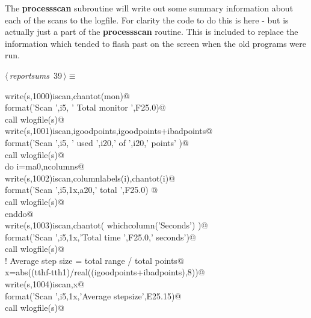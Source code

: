 \documentclass[10pt,a4paper,notitlepage]{article}
\newcommand{\code}[1]{\textbf{\textsf{#1}}} %
\begin{document}
The \code{processscan} subroutine will write out some summary information 
about each of the scans to the logfile. 
For clarity the code to do this is here - but is actually just a part of
the \code{processscan} routine. 
This is included to replace the information which tended to flash past 
on the screen when the old programs were run.

\begin{flushleft} \small
\begin{minipage}{\linewidth}\label{scrap42}\raggedright\small
{} $\langle\,${\it reportsums}\nobreak\ {\footnotesize {39}}$\,\rangle\equiv$
\vspace{-1ex}
\begin{list}{}{} \item
\mbox{}\verb@      write(s,1000)iscan,chantot(mon)@\\
\mbox{}  format('Scan ',i5, ' Total monitor ',F25.0)@\\
\mbox{}\verb@      call wlogfile(s)@\\
\mbox{}\verb@      write(s,1001)iscan,igoodpoints,igoodpoints+ibadpoints@\\
\mbox{}  format('Scan ',i5, ' used ',i20,' of ',i20,' points' )@\\
\mbox{}\verb@      call wlogfile(s)@\\
\mbox{}\verb@      do i=ma0,ncolumns@\\
\mbox{}\verb@       write(s,1002)iscan,columnlabels(i),chantot(i)@\\
\mbox{}   format('Scan ',i5,1x,a20,' total ',F25.0)      @\\
\mbox{}\verb@       call wlogfile(s)@\\
\mbox{}\verb@      enddo@\\
\mbox{}\verb@      write(s,1003)iscan,chantot( whichcolumn('Seconds') )@\\
\mbox{}  format('Scan ',i5,1x,'Total time          ',F25.0,' seconds')@\\
\mbox{}\verb@      call wlogfile(s)@\\
\mbox{}\verb@! Average step size = total range / total points@\\
\mbox{}\verb@      x=abs((tthf-tth1)/real((igoodpoints+ibadpoints),8))@\\
\mbox{}\verb@      write(s,1004)iscan,x@\\
\mbox{}  format('Scan ',i5,1x,'Average stepsize',E25.15)@\\
\mbox{}\verb@      call wlogfile(s)@\\

\end{list}
\end{minipage}
\end{flushleft}
\end{document}

